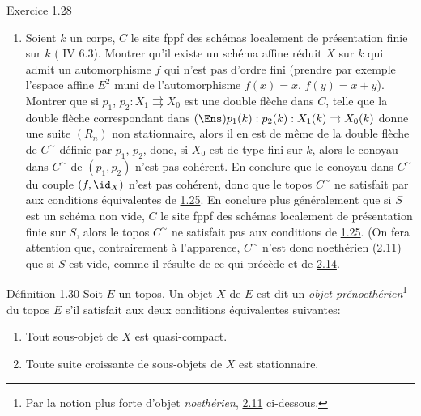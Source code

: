 \begin{enonce*}[remark]{Exercice 1.28}
\begin{enumerate}
\item Soient $k$ un corps, $C$ le site fppf des schémas localement de
  présentation finie sur $k$ ( IV 6.3). Montrer qu'il existe un
  schéma affine réduit $X$ sur $k$ qui admit un automorphisme $f$ qui
  n'est pas d'ordre fini (prendre par exemple l'espace affine $E^2$
  muni de l'automorphisme $f(x) = x$, $f(y) = x + y$).\pageoriginale
  Montrer que si
   $p_1$, $p_2 : X_1 \rightrightarrows X_0$ est une double flèche dans
  $C$, telle que la double flèche correspondant dans $(\Ens) p_1
  (\bar{k}):p_2(\bar{k}): X_1(\bar{k}) \rightrightarrows X_0
  (\bar{k})$ donne une suite $(R_n)$ non stationnaire, alors il en
  est de même de la double flèche de $C^{\sim}$ définie par $p_1$,
  $p_2$, donc, si $X_0$ est de type fini sur $k$, alors le conoyau
  dans $C^{\sim}$ de $(p_1, p_2)$ n'est pas cohérent. En conclure que
  le conoyau dans $C^{\sim}$ du couple $(f, \id_X)$ n'est pas
  cohérent, donc que le topos $C^{\sim}$ ne satisfait par aux
  conditions équivalentes de \hyperref[VI.cor1.25]{1.25}. En conclure plus généralement que
  si $S$ est un schéma non vide, $C$ le site fppf des schémas
  localement de présentation finie sur $S$, alors le topos $C^{\sim}$
  ne satisfait pas aux conditions de \hyperref[VI.cor1.25]{1.25}. (On fera attention que,
  contrairement à l'apparence, $C^{\sim}$ n'est donc noethérien (\hyperref[VI.def2.11]{2.11})
  que si $S$ est vide, comme il résulte de ce qui précède et de \hyperref[VI.subsec2.14]{2.14}.
\end{enumerate}
\end{enonce*}

\begin{enonce*}{Définition 1.30}
Soit $E$ un topos. Un objet $X$ de $E$ est dit un \emph{objet
prénoethérien}\footnote{Par la notion plus forte d'objet
  \emph{noethérien}, \cf \hyperref[VI.def2.11]{2.11} ci-dessous.} du topos $E$ s'il satisfait
aux deux conditions équivalentes suivantes:
\begin{enumerate}
\renewcommand{\theenumi}{\roman{enumi}}
\renewcommand{\labelenumi}{(\theenumi)}

\item Tout sous-objet de $X$ est quasi-compact.

\item Toute suite croissante de sous-objets de $X$ est stationnaire.
\end{enumerate}
\end{enonce*}

\setcounter{subsection}{30}
\setcounter{subsubsection}{0}
